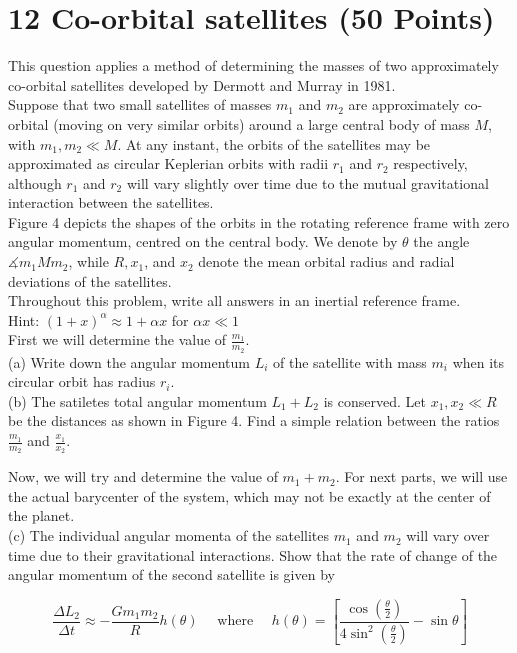 \documentclass[10pt]{article}
\begin{document}
\section*{12 Co-orbital satellites (50 Points)}
This question applies a method of determining the masses of two approximately co-orbital satellites developed by Dermott and Murray in 1981.\\
Suppose that two small satellites of masses $m_{1}$ and $m_{2}$ are approximately co-orbital (moving on very similar orbits) around a large central body of mass $M$, with $m_{1}, m_{2} \ll M$. At any instant, the orbits of the satellites may be approximated as circular Keplerian orbits with radii $r_{1}$ and $r_{2}$ respectively, although $r_{1}$ and $r_{2}$ will vary slightly over time due to the mutual gravitational interaction between the satellites.\\
Figure 4 depicts the shapes of the orbits in the rotating reference frame with zero angular momentum, centred on the central body. We denote by $\theta$ the angle $\measuredangle m_{1} M m_{2}$, while $R, x_{1}$, and $x_{2}$ denote the mean orbital radius and radial deviations of the satellites.\\
Throughout this problem, write all answers in an inertial reference frame.\\
Hint: $(1+x)^{\alpha} \approx 1+\alpha x$ for $\alpha x \ll 1$\\
First we will determine the value of $\frac{m_{1}}{m_{2}}$.\\
(a) Write down the angular momentum $L_{i}$ of the satellite with mass $m_{i}$ when its circular orbit has radius $r_{i}$.\\
(b) The satiletes total angular momentum $L_{1}+L_{2}$ is conserved. Let $x_{1}, x_{2} \ll R$ be the distances as shown in Figure 4. Find a simple relation between the ratios $\frac{m_{1}}{m_{2}}$ and $\frac{x_{1}}{x_{2}}$.

Now, we will try and determine the value of $m_{1}+m_{2}$. For next parts, we will use the actual barycenter of the system, which may not be exactly at the center of the planet.\\
(c) The individual angular momenta of the satellites $m_{1}$ and $m_{2}$ will vary over time due to their gravitational interactions. Show that the rate of change of the angular momentum of the second satellite is given by


\begin{equation*}
\frac{\Delta L_{2}}{\Delta t} \approx-\frac{G m_{1} m_{2}}{R} h(\theta) \quad \text { where } \quad h(\theta)=\left[\frac{\cos \left(\frac{\theta}{2}\right)}{4 \sin ^{2}\left(\frac{\theta}{2}\right)}-\sin \theta\right] \tag{18pt}
\end{equation*}
\end{document}
